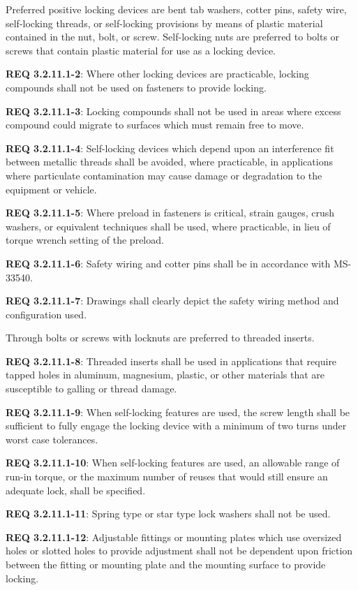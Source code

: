\documentclass[12pt]{article}
\begin{document}
Preferred positive locking devices are bent tab washers, cotter pins, safety wire, self-locking threads, or self-locking provisions by means of plastic material contained in the nut, bolt, or screw. 
Self-locking nuts are preferred to bolts or screws that contain plastic material for use as a locking device. 

\noindent \textbf{REQ 3.2.11.1-2}: Where other locking devices are practicable, locking compounds shall not be used on fasteners to provide locking. 

\noindent \textbf{REQ 3.2.11.1-3}: Locking compounds shall not be used in areas where excess compound could migrate to surfaces which must remain free to move. 

\noindent \textbf{REQ 3.2.11.1-4}: Self-locking devices which depend upon an interference fit between metallic threads shall be avoided, where practicable, in applications where particulate contamination may cause damage or degradation to the equipment or vehicle. 

\noindent \textbf{REQ 3.2.11.1-5}: Where preload in fasteners is critical, strain gauges, crush washers, or equivalent techniques shall be used, where practicable, in lieu of torque wrench setting of the preload. 

\noindent \textbf{REQ 3.2.11.1-6}: Safety wiring and cotter pins shall be in accordance with MS-33540. 

\noindent \textbf{REQ 3.2.11.1-7}: Drawings shall clearly depict the safety wiring method and configuration used. 

Through bolts or screws with locknuts are preferred to threaded inserts. 

\noindent \textbf{REQ 3.2.11.1-8}: Threaded inserts shall be used in applications that require tapped holes in aluminum, magnesium, plastic, or other materials that are susceptible to galling or thread damage. 

\noindent \textbf{REQ 3.2.11.1-9}: When self-locking features are used, the screw length shall be sufficient to fully engage the locking device with a minimum of two turns under worst case tolerances. 

\noindent \textbf{REQ 3.2.11.1-10}: When self-locking features are used, an allowable range of run-in torque, or the maximum number of reuses that would still ensure an adequate lock, shall be specified. 

\noindent \textbf{REQ 3.2.11.1-11}: Spring type or star type lock washers shall not be used. 

\noindent \textbf{REQ 3.2.11.1-12}: Adjustable fittings or mounting plates which use oversized holes or slotted holes to provide adjustment shall not be dependent upon friction between the fitting or mounting plate and the mounting surface to provide locking. 
\end{document}
